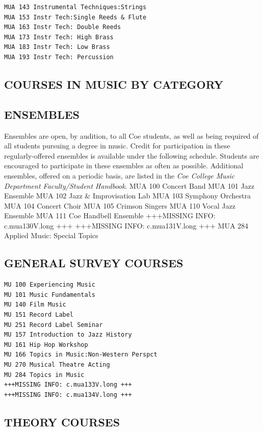 \documentclass[
  letterpaper,
]{scrbook}
\begin{document}
\begin{verbatim}
MUA 143 Instrumental Techniques:Strings
MUA 153 Instr Tech:Single Reeds & Flute
MUA 163 Instr Tech: Double Reeds
MUA 173 Instr Tech: High Brass
MUA 183 Instr Tech: Low Brass
MUA 193 Instr Tech: Percussion
\end{verbatim}

\hypertarget{courses-in-music-by-category}{%
\subsection{COURSES IN MUSIC BY
CATEGORY}\label{courses-in-music-by-category}}

\hypertarget{ensembles}{%
\subsection{ENSEMBLES}\label{ensembles}}

Ensembles are open, by audition, to all Coe students, as well as being
required of all students pursuing a degree in music. Credit for
participation in these regularly-offered ensembles is available under
the following schedule. Students are encouraged to participate in these
ensembles as often as possible. Additional ensembles, offered on a
periodic basis, are listed in the \emph{Coe College Music Department
Faculty/Student Handbook}. MUA 100 Concert Band MUA 101 Jazz Ensemble
MUA 102 Jazz \& Improvisation Lab MUA 103 Symphony Orchestra MUA 104
Concert Choir MUA 105 Crimson Singers MUA 110 Vocal Jazz Ensemble MUA
111 Coe Handbell Ensemble +++MISSING INFO: c.mua130V.long +++ +++MISSING
INFO: c.mua131V.long +++ MUA 284 Applied Music: Special Topics

\hypertarget{general-survey-courses}{%
\subsection{GENERAL SURVEY COURSES}\label{general-survey-courses}}

\begin{verbatim}
MU 100 Experiencing Music
MU 101 Music Fundamentals
MU 140 Film Music
MU 151 Record Label
MU 251 Record Label Seminar
MU 157 Introduction to Jazz History
MU 161 Hip Hop Workshop
MU 166 Topics in Music:Non-Western Perspct
MU 270 Musical Theatre Acting
MU 284 Topics in Music
+++MISSING INFO: c.mua133V.long +++
+++MISSING INFO: c.mua134V.long +++
\end{verbatim}

\hypertarget{theory-courses}{%
\subsection{THEORY COURSES}\label{theory-courses}}
\end{document}
